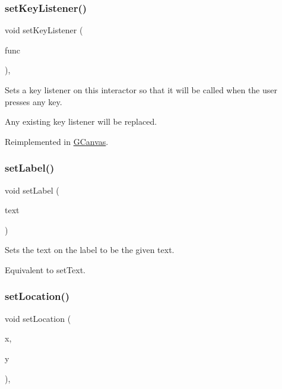 \subsubsection{\texorpdfstring{set\+Key\+Listener()}{setKeyListener()}\hspace{0.1cm}{\footnotesize\ttfamily [2/2]}}
{\footnotesize\ttfamily void set\+Key\+Listener (\begin{DoxyParamCaption}\item[{\mbox{\hyperlink{namespacesgl_a54427ce97bb1c2804e4fe2b0a62e8b17}{G\+Event\+Listener\+Void}}}]{func }\end{DoxyParamCaption})\hspace{0.3cm}{\ttfamily [virtual]}, {\ttfamily [inherited]}}



Sets a key listener on this interactor so that it will be called when the user presses any key. 

Any existing key listener will be replaced. 

Reimplemented in \mbox{\hyperlink{classsgl_1_1GCanvas_a1320ed9889a730dfead04a334463ecf3}{G\+Canvas}}.

\mbox{\label{classsgl_1_1GLabel_a4af0be0e092d87271c1432624bc00080}} 
\subsubsection{\texorpdfstring{set\+Label()}{setLabel()}}
{\footnotesize\ttfamily void set\+Label (\begin{DoxyParamCaption}\item[{const std\+::string \&}]{text }\end{DoxyParamCaption})\hspace{0.3cm}{\ttfamily [virtual]}}



Sets the text on the label to be the given text. 

Equivalent to set\+Text. \mbox{\label{classsgl_1_1GLabel_ae3b17c0aeb355dc23c4e4cbf066e81f7}} 
\subsubsection{\texorpdfstring{set\+Location()}{setLocation()}}
{\footnotesize\ttfamily void set\+Location (\begin{DoxyParamCaption}\item[{double}]{x,  }\item[{double}]{y }\end{DoxyParamCaption})\hspace{0.3cm}{\ttfamily [override]}, {\ttfamily [virtual]}}



